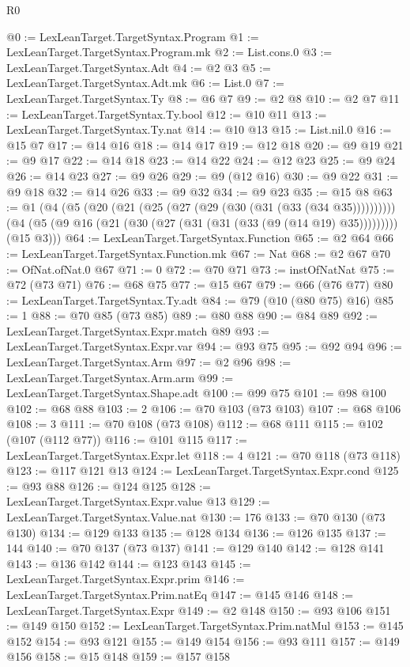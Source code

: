 \begin{lexlean}{R0}
\begin{coremodule}
@0 := LexLeanTarget.TargetSyntax.Program
@1 := LexLeanTarget.TargetSyntax.Program.mk
@2 := List.cons.{0}
@3 := LexLeanTarget.TargetSyntax.Adt
@4 := @2 @3
@5 := LexLeanTarget.TargetSyntax.Adt.mk
@6 := List.{0}
@7 := LexLeanTarget.TargetSyntax.Ty
@8 := @6 @7
@9 := @2 @8
@10 := @2 @7
@11 := LexLeanTarget.TargetSyntax.Ty.bool
@12 := @10 @11
@13 := LexLeanTarget.TargetSyntax.Ty.nat
@14 := @10 @13
@15 := List.nil.{0}
@16 := @15 @7
@17 := @14 @16
@18 := @14 @17
@19 := @12 @18
@20 := @9 @19
@21 := @9 @17
@22 := @14 @18
@23 := @14 @22
@24 := @12 @23
@25 := @9 @24
@26 := @14 @23
@27 := @9 @26
@29 := @9 (@12 @16)
@30 := @9 @22
@31 := @9 @18
@32 := @14 @26
@33 := @9 @32
@34 := @9 @23
@35 := @15 @8
@63 := @1
    (@4
      (@5 (@20 (@21 (@25 (@27 (@29 (@30 (@31 (@33 (@34 @35))))))))))
      (@4 (@5 (@9 @16 (@21 (@30 (@27 (@31 (@31 (@33 (@9 (@14 @19) @35))))))))) (@15 @3)))
@64 := LexLeanTarget.TargetSyntax.Function
@65 := @2 @64
@66 := LexLeanTarget.TargetSyntax.Function.mk
@67 := Nat
@68 := @2 @67
@70 := OfNat.ofNat.{0} @67
@71 := 0
@72 := @70 @71
@73 := instOfNatNat
@75 := @72 (@73 @71)
@76 := @68 @75
@77 := @15 @67
@79 := @66 (@76 @77)
@80 := LexLeanTarget.TargetSyntax.Ty.adt
@84 := @79 (@10 (@80 @75) @16)
@85 := 1
@88 := @70 @85 (@73 @85)
@89 := @80 @88
@90 := @84 @89
@92 := LexLeanTarget.TargetSyntax.Expr.match @89
@93 := LexLeanTarget.TargetSyntax.Expr.var
@94 := @93 @75
@95 := @92 @94
@96 := LexLeanTarget.TargetSyntax.Arm
@97 := @2 @96
@98 := LexLeanTarget.TargetSyntax.Arm.arm
@99 := LexLeanTarget.TargetSyntax.Shape.adt
@100 := @99 @75
@101 := @98 @100
@102 := @68 @88
@103 := 2
@106 := @70 @103 (@73 @103)
@107 := @68 @106
@108 := 3
@111 := @70 @108 (@73 @108)
@112 := @68 @111
@115 := @102 (@107 (@112 @77))
@116 := @101 @115
@117 := LexLeanTarget.TargetSyntax.Expr.let
@118 := 4
@121 := @70 @118 (@73 @118)
@123 := @117 @121 @13
@124 := LexLeanTarget.TargetSyntax.Expr.cond
@125 := @93 @88
@126 := @124 @125
@128 := LexLeanTarget.TargetSyntax.Expr.value @13
@129 := LexLeanTarget.TargetSyntax.Value.nat
@130 := 176
@133 := @70 @130 (@73 @130)
@134 := @129 @133
@135 := @128 @134
@136 := @126 @135
@137 := 144
@140 := @70 @137 (@73 @137)
@141 := @129 @140
@142 := @128 @141
@143 := @136 @142
@144 := @123 @143
@145 := LexLeanTarget.TargetSyntax.Expr.prim
@146 := LexLeanTarget.TargetSyntax.Prim.natEq
@147 := @145 @146
@148 := LexLeanTarget.TargetSyntax.Expr
@149 := @2 @148
@150 := @93 @106
@151 := @149 @150
@152 := LexLeanTarget.TargetSyntax.Prim.natMul
@153 := @145 @152
@154 := @93 @121
@155 := @149 @154
@156 := @93 @111
@157 := @149 @156
@158 := @15 @148
@159 := @157 @158

\end{coremodule}
\end{lexlean}
